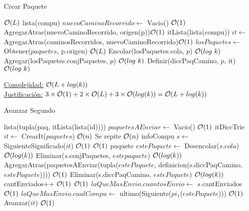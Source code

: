 \begin{Algoritmos}
\begin{algorithm}
\caption{Crear Paquete}
\begin{algorithmic}[1]
    \Comment $\mathcal{O}(L)$
   \State lista(compu) $nuevoCaminoRecorrido \gets$ Vacio() \Comment $\mathcal{O}(1)$
   \State AgregarAtras(nuevoCaminoRecorrido, origen(p))\Comment  $\mathcal{O}(1)$
   \State itLista(lista(compu)) $it \gets$ AgregarAtras(caminosRecorridos, nuevoCaminoRecorrido)\Comment $\mathcal{O}(1)$
   \State $losPaquetes \gets $ Obtener($paquetes$, p.origen) \Comment $\mathcal{O}(L)$
   \State Encolar(losPaquetes.cola, $p$) \Comment $\mathcal{O}(log \ k)$
   \State Agregar(losPaquetes.conjPaquetes, $p$) \Comment $\mathcal{O}(log \ k)$
   \State Definir(diccPaqCamino, $p$, it) \Comment $\mathcal{O}(log \ k)$
   \EndIf
   \EndProcedure
\end{algorithmic}
\underline{Complejidad:} $\mathcal{O}(L + log(k))$\\
\underline{Justificación:} $3 \times \mathcal{O}(1)+2 \times \mathcal{O}(L)+3\times \mathcal{O}(log(k)) = \mathcal{O}(L + log(k))$
\end{algorithm}


\begin{algorithm}
\caption{Avanzar Segundo}
\begin{algorithmic}[1]
  
  \State lista(tupla(paq, itLista(lista(id)))) $paquetesAEnviar \gets$ Vacio() \Comment  $\mathcal{O}(1)$
  \State itDiccTrie $it \gets$ CrearIt($paquetes$) \Comment  $\mathcal{O}(n)$
   \Comment Se repite $\mathcal{O}(n)$  
  	\State infoCompu $s \gets$ SiguienteSignificado($it$) \Comment  $\mathcal{O}(1)$ 
  	 \Comment  $\mathcal{O}(1)$
  		\State paquete $estePaquete \gets$ Desencolar($s$.$cola$) \Comment  $\mathcal{O}(log(k))$
  		\State Eliminar($s$.conjPaquetes, $estepaquete$) \Comment  $\mathcal{O}(log(k))$
		\State AgregarAtras(paquetesAEnviar(tupla($estePaquete$, definicion(s.diccPaqCamino, $estePaquete$)))) 
		\State\Comment  $\mathcal{O}(1)$
		\State Eliminar(s.diccPaqCamino, $estePaquete$)  \Comment  $\mathcal{O}(log(k))$
		\State cantEnviados++ \Comment  $\mathcal{O}(1)$
		 \Comment  $\mathcal{O}(1)$
		   \State $laQueMasEnvio.cuantosEnvio \gets$ $s$.cantEnviados \Comment  $\mathcal{O}(1)$
		   \State $laQueMasEnvio.cualCompu \gets$ ultimo(Siguiente($pi_1$($estePaquete$))) \Comment  $\mathcal{O}(1)$
		\EndIf 
	\EndIf
	\State Avanzar($it$) \Comment  $\mathcal{O}(1)$
  \EndWhile 
   

\end{algorithmic}
\end{algorithm}
\end{Algoritmos}
